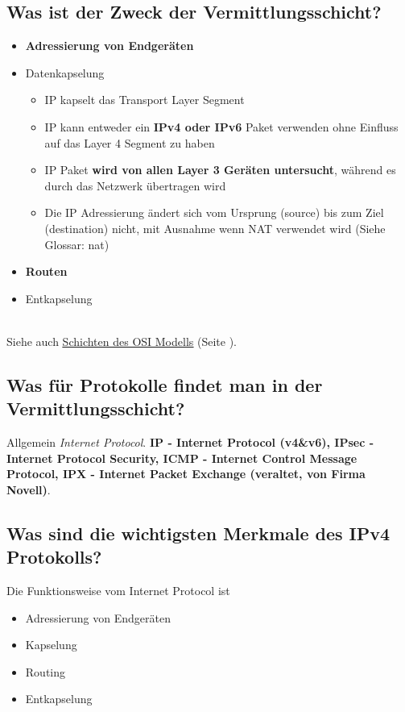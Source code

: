 \subsection*{Was ist der Zweck der Vermittlungsschicht?}
\begin{itemize}
    \item \textbf{Adressierung von Endgeräten }
    \item Datenkapselung
    \begin{itemize}
        \item IP kapselt das Transport Layer Segment
        \item IP kann entweder ein \textbf{IPv4 oder IPv6} Paket verwenden ohne Einfluss auf das Layer 4 Segment zu haben
        \item IP Paket \textbf{wird von allen Layer 3 Geräten untersucht}, während es durch das Netzwerk übertragen wird
        \item Die IP Adressierung ändert sich vom Ursprung (source) bis zum Ziel (destination) nicht, mit Ausnahme wenn NAT verwendet wird (Siehe Glossar: \gls{nat})
    \end{itemize}
    \item \textbf{Routen}
    \item Entkapselung
\end{itemize}\,\\
Siehe auch \underline{\hyperref[sub:SchichtenOSIModell]{Schichten des OSI Modells}} (Seite \pageref{sub:SchichtenOSIModell}).

\subsection*{Was für Protokolle findet man in der Vermittlungsschicht?}
Allgemein \textsl{Internet Protocol}. \textbf{IP - Internet Protocol (v4\&v6), IPsec - Internet Protocol Security, ICMP - Internet Control Message Protocol, IPX - Internet Packet Exchange (veraltet, von Firma Novell)}.

\subsection*{Was sind die wichtigsten Merkmale des IPv4 Protokolls?}
Die Funktionsweise vom Internet Protocol ist
\begin{itemize}
    \item Adressierung von Endgeräten
    \item Kapselung
    \item Routing
    \item Entkapselung
\end{itemize}

